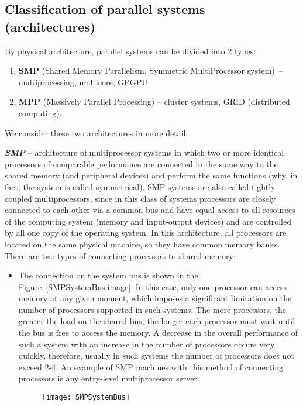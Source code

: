 { %
	\subsection{Classification of parallel systems (architectures)}
	\par By physical architecture, parallel systems can be divided into 2 types:
		\begin{enumerate}
			\item\textbf{SMP} (Shared Memory Parallelism, Symmetric MultiProcessor system)~– multiprocessing, multicore, GPGPU. 
			\item\textbf{MPP} (Massively Parallel Processing) – cluster systems, GRID (distributed computing).
		\end{enumerate}
	\par We consider these two architectures in more detail.
	\par\textbf{\textit{SMP}} – architecture of multiprocessor systems in which two or more identical processors of comparable performance are connected in the same way to the shared memory (and peripheral devices) and perform the same functions (why, in fact, the system is called symmetrical). SMP systems are also called tightly coupled multiprocessors, since in this class of systems processors are closely connected to each other via a common bus and have equal access to all resources of the computing system (memory and input-output devices) and are controlled by all one copy of the operating system. In this architecture, all processors are located on the same physical machine, so they have common memory banks. There are two types of connecting processors to shared memory:
		\begin{itemize}
			\item The connection on the system bus is shown in the Figure~\ref{SMPSystemBus:image}. In this case, only one processor can access memory at any given moment, which imposes a significant limitation on the number of processors supported in such systems. The more processors, the greater the load on the shared bus, the longer each processor must wait until the bus is free to access the memory. A decrease in the overall performance of such a system with an increase in the number of processors occurs very quickly, therefore, usually in such systems the number of processors does not exceed 2-4. An example of SMP machines with this method of connecting processors is any entry-level multiprocessor server.
				\begin{figure}[H]
					\texttt{[image: SMPSystemBus]}

\end{figure}
\end{itemize}}
